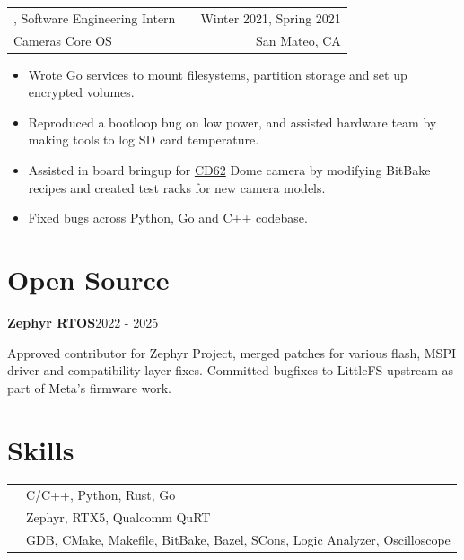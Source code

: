 \documentclass[letterpaper,10pt]{article}
\makeatletter
\let\stdtextbf\textbf
\renewcommand{\textbf}[1]{{\fontfamily{bch}\selectfont\stdtextbf{#1}}}
\newlength{\blockgap}\setlength{\blockgap}{6pt}
\newlength{\itemgap}\setlength{\itemgap}{3pt}
\newenvironment{jobitem}[5]{%
    \begin{tabularx}{\linewidth}{@{}l X r@{}}
        \textbf{#1}, #2 & & #3 \\[\itemgap]
        #4              & & #5
    \end{tabularx}
    \vspace{-5pt}
    \begin{itemize}
}{%
    \end{itemize}
    \vspace{\blockgap}
}
\newenvironment{projectitem}[2]{%
    \textbf{#1}\hfill #2\par
}{%
    \par\vspace{\blockgap}
}
\makeatother
\begin{document}
\begin{jobitem}{Verkada}{Software Engineering Intern}{Winter 2021, Spring 2021}{Cameras Core OS}{San Mateo, CA}
    \item Wrote Go services to mount filesystems, partition storage and set up encrypted volumes.
    \item Reproduced a bootloop bug on low power, and assisted hardware team by making tools to log SD card temperature.
    \item Assisted in board bringup for \href{https://www.verkada.com/security-cameras/dome/cd63/}{CD62} Dome camera by modifying BitBake recipes and created test racks for new camera models.
    \item Fixed bugs across Python, Go and C++ codebase.
\end{jobitem}


\section{Open Source}

\begin{projectitem}{Zephyr RTOS}{2022 - 2025}
    Approved contributor for Zephyr Project, merged patches for various flash, MSPI driver and compatibility layer fixes.
    Committed bugfixes to LittleFS upstream as part of Meta's firmware work.
\end{projectitem}



\section{Skills}

\begingroup
\renewcommand{\arraystretch}{1.25}
\begin{tabularx}{\linewidth}{@{}l X@{}}
    \textbf{Languages} & C/C++, Python, Rust, Go                          \\
    \textbf{RTOS}      & Zephyr, RTX5, Qualcomm QuRT                      \\
    \textbf{Tools}     & GDB, CMake, Makefile, BitBake, Bazel, SCons, Logic Analyzer, Oscilloscope
\end{tabularx}
\endgroup
\end{document}
